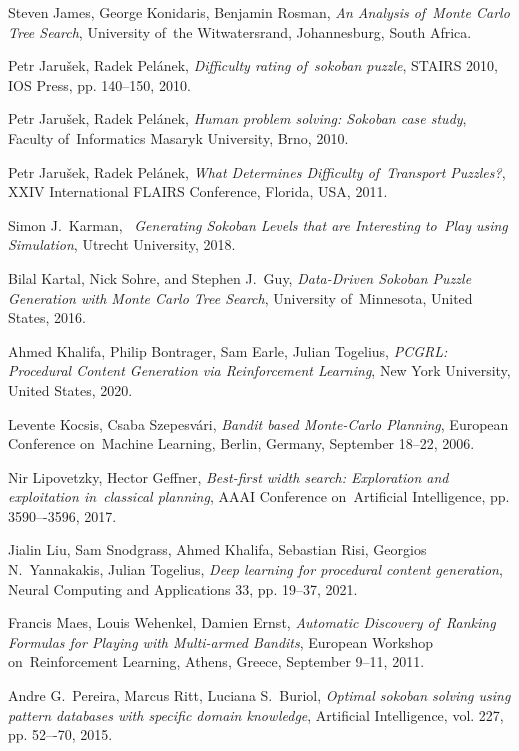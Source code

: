 \documentclass[a4paper,11pt,twoside]{report}
\theoremstyle{definition}
\begin{document}
\begin{thebibliography}{32}
 Steven James, George Konidaris, Benjamin Rosman, \emph{An Analysis of~Monte Carlo Tree Search}, University of~the Witwatersrand, Johannesburg, South Africa.

 Petr Jarušek, Radek Pelánek, \emph{Difficulty rating of~sokoban puzzle}, STAIRS 2010, IOS Press, pp. 140--150, 2010.

 Petr Jarušek, Radek Pelánek, \emph{Human problem solving: Sokoban case study}, Faculty of~Informatics Masaryk University, Brno, 2010.

 Petr Jarušek, Radek Pelánek, \emph{What Determines Difficulty of~Transport Puzzles?}, XXIV International FLAIRS Conference, Florida, USA, 2011.

 Simon J.~Karman, ~\emph{Generating Sokoban Levels that are Interesting to~Play using Simulation}, Utrecht University, 2018.

 Bilal Kartal, Nick Sohre, and Stephen J.~Guy, \emph{Data-Driven Sokoban Puzzle Generation with Monte Carlo Tree Search}, University of~Minnesota, United States, 2016.

 Ahmed Khalifa, Philip Bontrager, Sam Earle, Julian Togelius, \emph{PCGRL: Procedural Content Generation via Reinforcement Learning}, New York University, United States, 2020.

 Levente Kocsis, Csaba Szepesvári, \emph{Bandit based Monte-Carlo Planning}, European Conference on~Machine Learning, Berlin, Germany, September 18--22, 2006.

 Nir Lipovetzky, Hector Geffner, \emph{Best-first width search: Exploration and exploitation in~classical planning}, AAAI Conference on~Artificial Intelligence, pp. 3590–-3596, 2017.

 Jialin Liu, Sam Snodgrass, Ahmed Khalifa, Sebastian Risi, Georgios N.~Yannakakis, Julian Togelius, \emph{Deep learning for procedural content generation}, Neural Computing and Applications 33, pp. 19--37, 2021.

 Francis Maes, Louis Wehenkel, Damien Ernst, \emph{Automatic Discovery of~Ranking Formulas for Playing with Multi-armed Bandits}, European Workshop on~Reinforcement Learning, Athens, Greece, September 9--11, 2011.

 Andre G.~Pereira, Marcus Ritt, Luciana S.~Buriol, \emph{Optimal sokoban solving using pattern databases with specific domain knowledge}, Artificial Intelligence, vol. 227, pp. 52–-70, 2015.


\end{thebibliography}
\end{document}

